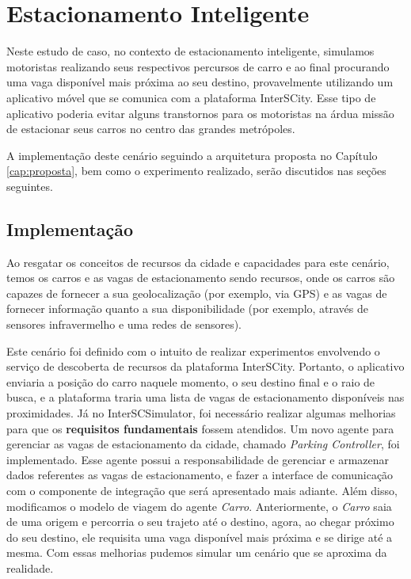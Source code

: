 \section{Estacionamento Inteligente}

Neste estudo de caso, no contexto de estacionamento inteligente, simulamos motoristas realizando seus respectivos percursos de carro e ao final procurando uma vaga disponível mais próxima ao
seu destino, provavelmente utilizando um aplicativo móvel que se comunica com a plataforma InterSCity.
Esse tipo de aplicativo poderia evitar alguns transtornos para os motoristas na árdua missão de estacionar seus carros no centro das grandes metrópoles.

A implementação deste cenário seguindo a arquitetura proposta no Capítulo \ref{cap:proposta}, bem como o experimento realizado, serão discutidos nas seções seguintes.

\subsection{Implementação}
\label{sec:smart_parking}

Ao resgatar os conceitos de recursos da cidade e capacidades para este cenário, temos os carros e as vagas de estacionamento sendo recursos, onde os carros são capazes de
fornecer a sua geolocalização (por exemplo, via GPS) e as vagas de fornecer informação quanto a sua disponibilidade (por exemplo, através de sensores infravermelho e uma
redes de sensores).

Este cenário foi definido com o intuito de realizar experimentos envolvendo o serviço de descoberta de recursos da plataforma InterSCity.
Portanto, o aplicativo enviaria a posição do carro naquele momento, o seu destino final e o raio de busca, e a plataforma traria uma lista de vagas de estacionamento
disponíveis nas proximidades.
Já no InterSCSimulator, foi necessário realizar algumas melhorias para que os \textbf{requisitos fundamentais} fossem atendidos.
Um novo agente para gerenciar as vagas de estacionamento da cidade, chamado \textit{Parking Controller}, foi implementado.
Esse agente possui a responsabilidade de gerenciar e armazenar dados referentes as vagas de estacionamento, e fazer a interface de comunicação com o componente de
integração que será apresentado mais adiante.
Além disso, modificamos o modelo de viagem do agente \textit{Carro}.
Anteriormente, o \textit{Carro} saia de uma origem e percorria o seu trajeto até o destino, agora, ao chegar próximo do seu destino, ele requisita uma vaga disponível mais
próxima e se dirige até a mesma.
Com essas melhorias pudemos simular um cenário que se aproxima da realidade.

